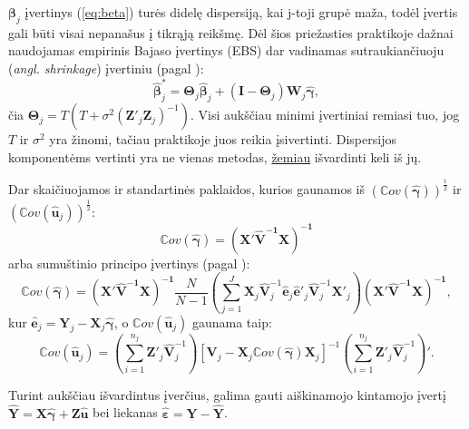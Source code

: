 \documentclass[12pt,a4paper]{article}
\begin{document}
$\boldsymbol{\beta}_j$ įvertinys (\ref{eq:beta}) turės didelę dispersiją, kai j-toji grupė maža, todėl įvertis gali būti visai nepanašus į tikrąją reikšmę. Dėl šios priežasties praktikoje dažnai naudojamas empirinis Bajaso įvertinys (EBS) dar vadinamas sutraukiančiuoju (\textit{angl. shrinkage}) įvertiniu (pagal \cite{shrinkage}):
\begin{equation}
\boldsymbol{\hat{\beta}}^*_{j}=\boldsymbol{\Theta}_j\boldsymbol{\hat{\beta}}_j+(\boldsymbol{I} - \boldsymbol{\Theta}_j)\mathbf{W}_j\boldsymbol{\hat{\gamma}},
\end{equation}
čia $\mathbf{\Theta}_j=T\left(T+\sigma^2(\mathbf{Z}'_j\mathbf{Z}_j)^{-1}\right)$. Visi aukščiau minimi įvertiniai remiasi tuo, jog $T$ ir $\sigma^2$ yra žinomi, tačiau praktikoje juos reikia įsivertinti. Dispersijos komponentėms vertinti yra ne vienas metodas, \hyperlink{reml}{žemiau} išvardinti keli iš jų.

\indent Dar skaičiuojamos ir standartinės paklaidos, kurios gaunamos iš $(\mathbb{C}ov(\boldsymbol{\hat{\gamma}}))^{\frac{1}{2}}$ ir $(\mathbb{C}ov(\mathbf{\hat{u}}_j))^{\frac{1}{2}}$:
\begin{equation}
\mathbb{C}ov(\boldsymbol{\hat{\gamma}})=\mathbf{(X'\hat{V}^{-1}X)^{-1}}
\end{equation}
arba sumuštinio principo įvertinys (pagal \cite{sandwich}):
\begin{equation}
\mathbb{C}ov(\boldsymbol{\hat{\gamma}})=\mathbf{(X'\hat{V}^{-1}X)^{-1}}\frac{N}{N-1}\left(\sum^J_{j=1}\mathbf{X}_j\mathbf{\hat{V}}^{-1}_j\mathbf{\hat{e}}_j\mathbf{\hat{e}}'_j \mathbf{\hat{V}}^{-1}_j\mathbf{X}'_j\right)\mathbf{(X'\hat{V}^{-1}X)^{-1}},
\end{equation}
kur $\mathbf{\hat{e}}_j=\mathbf{Y}_j-\mathbf{X}_j\boldsymbol{\hat{\gamma}}$, o $\mathbb{C}ov(\mathbf{\hat{u}}_j)$ gaunama taip:
\begin{equation}
\mathbb{C}ov(\mathbf{\hat{u}}_j)=\left(\sum^{n_j}_{i=1}\mathbf{Z}'_j\mathbf{\hat{V}}^{-1}_j\right) \left[\mathbf{V}_j-\mathbf{X}_j\mathbb{C}ov(\boldsymbol{\hat{\gamma}})\mathbf{X}_j\right]^{-1} \left(\sum^{n_j}_{i=1}\mathbf{Z}'_j\mathbf{\hat{V}}^{-1}_j\right)'.
\end{equation}

\indent Turint aukščiau išvardintus įverčius, galima gauti aiškinamojo kintamojo įvertį $\mathbf{\hat{Y}}=\mathbf{X}\boldsymbol{\hat{\gamma}}+\mathbf{Z\hat{u}}$ bei liekanas $\boldsymbol{\hat{\varepsilon}}=\mathbf{Y}-\mathbf{\hat{Y}}$.
\end{document}
